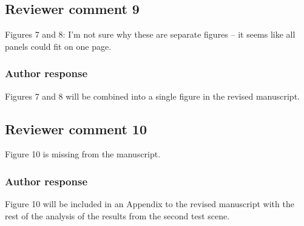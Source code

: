 \documentclass[11pt]{scrartcl}
\providecommand{\DIFadd}[1]{{\protect\textcolor{blue}{\uwave{#1}}}} %
\providecommand{\DIFdel}[1]{{\protect\textcolor{red}{\sout{#1}}}}                      %
\providecommand{\DIFaddFL}[1]{\DIFadd{#1}} %
\providecommand{\DIFdelFL}[1]{\DIFdel{#1}} %
\providecommand{\DIFaddbeginFL}{} %
\providecommand{\DIFaddendFL}{} %
\providecommand{\DIFdelbeginFL}{} %
\providecommand{\DIFdelendFL}{} %
\begin{document}
\subsection*{Reviewer comment 9}

Figures 7 and 8:  I’m not sure why these are separate figures – it seems like all panels could fit on one page.

\subsubsection*{Author response}

Figures 7 and 8 will be combined into a single figure in the revised
manuscript.

\subsection*{Reviewer comment 10}

Figure 10 is missing from the manuscript.

\subsubsection*{Author response}

Figure 10 will be included in an Appendix to the revised manuscript with the
rest of the analysis of the results from the second test scene.


%
\end{document}
